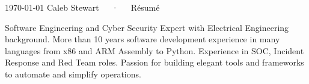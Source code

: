 \documentclass[11pt, letterpaper]{awesome-cv}
\begin{document}
\makecvheader[C]

\makecvfooter
  {\today}
  {Caleb Stewart~~~·~~~Résumé}
  {\thepage}

\begin{cvparagraph}

Software Engineering and Cyber Security Expert with Electrical Engineering background. More than 10 years software development experience in many languages from x86 and ARM Assembly to Python. Experience in SOC, Incident Response and Red Team roles. Passion for building elegant tools and frameworks to automate and simplify operations.


\end{cvparagraph}
\end{document}
